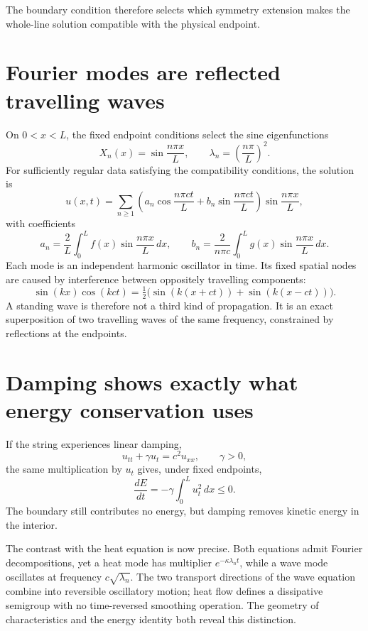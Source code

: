 The boundary condition therefore selects which symmetry extension makes the whole-line solution compatible with the physical endpoint.

\section{Fourier modes are reflected travelling waves}

On \(0<x<L\), the fixed endpoint conditions select the sine eigenfunctions
\[
 X_n(x)=\sin\frac{n\pi x}{L},
 \qquad \lambda_n=\left(\frac{n\pi}{L}\right)^2.
\]
For sufficiently regular data satisfying the compatibility conditions, the solution is
\[
 \boxed{
 u(x,t)=\sum_{n\ge1}
 \left(
 a_n\cos\frac{n\pi ct}{L}
 +b_n\sin\frac{n\pi ct}{L}
 \right)\sin\frac{n\pi x}{L},
 }
\]
with coefficients
\[
 a_n=\frac2L\int_0^Lf(x)\sin\frac{n\pi x}{L}\,dx,\qquad
 b_n=\frac{2}{n\pi c}\int_0^Lg(x)\sin\frac{n\pi x}{L}\,dx.
\]
Each mode is an independent harmonic oscillator in time. Its fixed spatial nodes are caused by interference between oppositely travelling components:
\[
 \sin(kx)\cos(kct)
 =\tfrac12\bigl(\sin(k(x+ct))+\sin(k(x-ct))\bigr).
\]
A standing wave is therefore not a third kind of propagation. It is an exact superposition of two travelling waves of the same frequency, constrained by reflections at the endpoints.

\section{Damping shows exactly what energy conservation uses}

If the string experiences linear damping,
\[
 u_{tt}+\gamma u_t=c^2u_{xx},\qquad \gamma>0,
\]
the same multiplication by \(u_t\) gives, under fixed endpoints,
\[
 \boxed{\frac{dE}{dt}=-\gamma\int_0^Lu_t^2\,dx\le0.}
\]
The boundary still contributes no energy, but damping removes kinetic energy in the interior.

The contrast with the heat equation is now precise. Both equations admit Fourier decompositions, yet a heat mode has multiplier \(e^{-\kappa\lambda_nt}\), while a wave mode oscillates at frequency \(c\sqrt{\lambda_n}\). The two transport directions of the wave equation combine into reversible oscillatory motion; heat flow defines a dissipative semigroup with no time-reversed smoothing operation. The geometry of characteristics and the energy identity both reveal this distinction.
